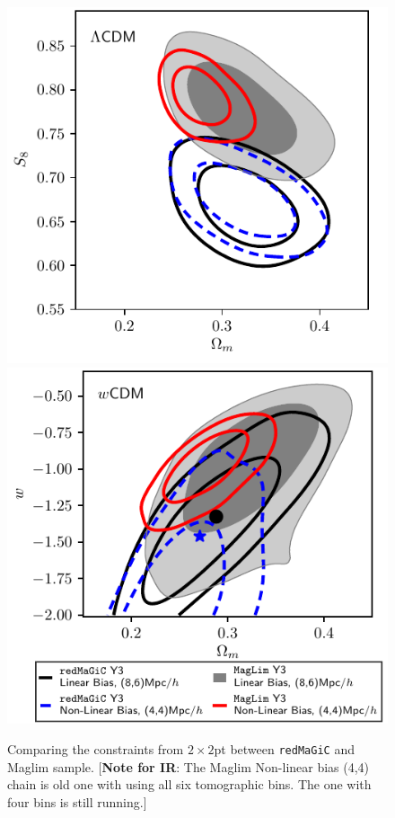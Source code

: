 \documentclass[fleqn,usenatbib]{mnras}
\newcommand{\redmagic}{\texttt{redMaGiC} }
\newcommand{\IR}[1]{{\color{red}[\textbf{Note for IR}: #1]}}
\begin{document}
\begin{figure}
\includegraphics[width=\columnwidth]{figs/compare_maglim_rm_lcdm.pdf}
\includegraphics[width=\columnwidth]{figs/compare_maglim_rm_wcdm.pdf}
\caption[]{Comparing the constraints from $2\times2$pt between \redmagic and Maglim sample. \IR{The Maglim Non-linear bias (4,4) chain is old one with using all six tomographic bins. The one with four bins is still running.}}\label{fig:maglim_comp}
\end{figure}
\end{document}
